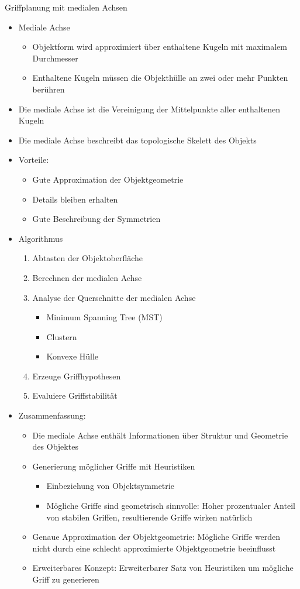 \documentclass[paper=a4, fontsize=11pt]{scrartcl} %
\numberwithin{equation}{section} %
\numberwithin{figure}{section} %
\numberwithin{table}{section} %
\begin{document}
Griffplanung mit medialen Achsen
\begin{itemize}
\item Mediale Achse
\begin{itemize}
\item Objektform wird approximiert über enthaltene Kugeln mit maximalem Durchmesser
\item Enthaltene Kugeln müssen die Objekthülle an zwei oder mehr Punkten berühren
\end{itemize}
\item Die mediale Achse ist die Vereinigung der Mittelpunkte aller enthaltenen Kugeln
\item Die mediale Achse beschreibt das topologische Skelett des Objekts
\item Vorteile:
\begin{itemize}
\item Gute Approximation der Objektgeometrie
\item Details bleiben erhalten
\item Gute Beschreibung der Symmetrien
\end{itemize}
\item Algorithmus
\begin{enumerate}
\item Abtasten der Objektoberfläche
\item Berechnen der medialen Achse
\item Analyse der Querschnitte der medialen Achse
\begin{itemize}
\item Minimum Spanning Tree (MST)
\item Clustern
\item Konvexe Hülle
\end{itemize}
\item Erzeuge Griffhypothesen
\item Evaluiere Griffstabilität
\end{enumerate}
\item Zusammenfassung:
\begin{itemize}
\item Die mediale Achse enthält Informationen über Struktur und Geometrie des Objektes
\item Generierung möglicher Griffe mit Heuristiken
\begin{itemize}
\item Einbeziehung von Objektsymmetrie
\item Mögliche Griffe sind geometrisch sinnvolle: Hoher prozentualer Anteil von stabilen Griffen, resultierende Griffe wirken natürlich
\end{itemize}
\item Genaue Approximation der Objektgeometrie: Mögliche Griffe werden nicht durch eine schlecht approximierte Objektgeometrie beeinflusst
\item Erweiterbares Konzept: Erweiterbarer Satz von Heuristiken um mögliche Griff zu generieren
\end{itemize}
\end{itemize}
\end{document}
